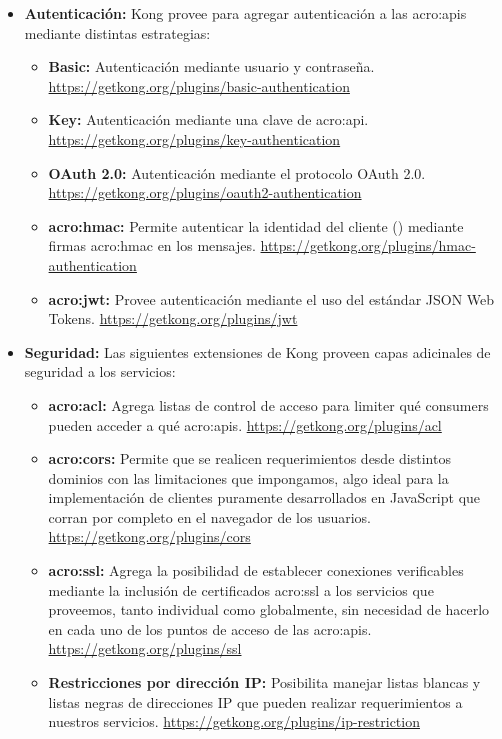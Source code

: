 \begin{itemize}
  \item \textbf{Autenticación:} Kong provee  para agregar autenticación a las \glspl{acro:api} mediante distintas estrategias:
  \begin{itemize}
    \item \textbf{Basic:} Autenticación mediante usuario y contraseña. \url{https://getkong.org/plugins/basic-authentication}
    \item \textbf{Key:} Autenticación mediante una clave de \gls{acro:api}. \url{https://getkong.org/plugins/key-authentication}
    \item \textbf{OAuth 2.0:} Autenticación mediante el protocolo OAuth 2.0. \url{https://getkong.org/plugins/oauth2-authentication}
    \item \textbf{\gls{acro:hmac}:} Permite autenticar la identidad del cliente () mediante firmas \gls{acro:hmac} en los mensajes. \url{https://getkong.org/plugins/hmac-authentication}
    \item \textbf{\gls{acro:jwt}:} Provee autenticación mediante el uso del estándar JSON Web Tokens. \url{https://getkong.org/plugins/jwt}
  \end{itemize}

  \item \textbf{Seguridad:} Las siguientes extensiones de Kong proveen capas adicinales de seguridad a los servicios:
  \begin{itemize}
    \item \textbf{\gls{acro:acl}:} Agrega listas de control de acceso para limiter qué consumers pueden acceder a qué \glspl{acro:api}. \url{https://getkong.org/plugins/acl}
    \item \textbf{\gls{acro:cors}:} Permite que se realicen requerimientos desde distintos dominios con las limitaciones que impongamos, algo ideal para la implementación de clientes puramente desarrollados en JavaScript que corran por completo en el navegador de los usuarios. \url{https://getkong.org/plugins/cors}
    \item \textbf{\gls{acro:ssl}:} Agrega la posibilidad de establecer conexiones verificables mediante la inclusión de certificados \gls{acro:ssl} a los servicios que proveemos, tanto individual como globalmente, sin necesidad de hacerlo en cada uno de los puntos de acceso de las \glspl{acro:api}. \url{https://getkong.org/plugins/ssl}
    \item \textbf{Restricciones por dirección IP:} Posibilita manejar listas blancas y listas negras de direcciones IP que pueden realizar requerimientos a nuestros servicios. \url{https://getkong.org/plugins/ip-restriction}
  \end{itemize}


\end{itemize}
